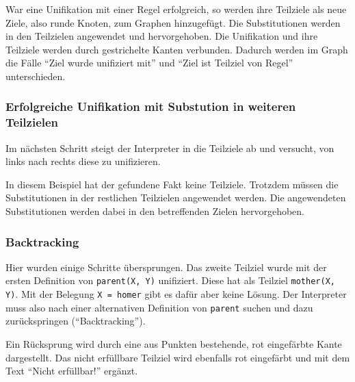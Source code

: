 \documentclass[parskip=full,11pt,twoside]{scrartcl}
\begin{document}
War eine Unifikation mit einer Regel erfolgreich, so werden ihre Teilziele als neue Ziele, also runde Knoten, zum Graphen hinzugefügt.
Die Substitutionen werden in den Teilzielen angewendet und hervorgehoben.
Die Unifikation und ihre Teilziele werden durch gestrichelte Kanten verbunden.
Dadurch werden im Graph die Fälle \enquote{Ziel wurde unifiziert mit} und \enquote{Ziel ist Teilziel von Regel} unterschieden.

\subsubsection{Erfolgreiche Unifikation mit Substution in weiteren Teilzielen}

Im nächsten Schritt steigt der Interpreter in die Teilziele ab und versucht, von links nach rechts diese zu unifizieren.

\begin{minipage}{\linewidth}
\end{minipage}

In diesem Beispiel hat der gefundene Fakt keine Teilziele.
Trotzdem müssen die Substitutionen in der restlichen Teilzielen angewendet werden.
Die angewendeten Substitutionen werden dabei in den betreffenden Zielen hervorgehoben.

\subsubsection{Backtracking}

Hier wurden einige Schritte übersprungen.
Das zweite Teilziel wurde mit der ersten Definition von \texttt{parent(X, Y)} unifiziert.
Diese hat als Teilziel \texttt{mother(X, Y)}.
Mit der Belegung \texttt{X = homer} gibt es dafür aber keine Lösung.
Der Interpreter muss also nach einer alternativen Definition von \texttt{parent} suchen und dazu zurückspringen (\enquote{Backtracking}).

\begin{minipage}{\linewidth}
\end{minipage}

Ein Rücksprung wird durch eine aus Punkten bestehende, rot eingefärbte Kante dargestellt.
Das nicht erfüllbare Teilziel wird ebenfalls rot eingefärbt und mit dem Text \enquote{Nicht erfüllbar!} ergänzt.
\end{document}

